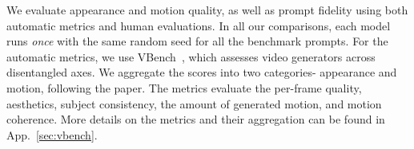 \begin{table}[t!]
    \caption{\textbf{Comparison of VideoJAM-30B with prior work on VideoJAM-bench.} Human evaluation shows \emph{percentage of votes favoring VideoJAM}; automatic metrics use VBench.}
  \label{tab:30b}
  \centering
    \setlength{\tabcolsep}{3.5pt}
    \vspace{-14px}
\end{table}
 We evaluate appearance and motion quality, as well as prompt fidelity using both automatic metrics and human evaluations. In all our comparisons, each model runs \emph{once} with the same random seed for all the benchmark prompts. For the automatic metrics, we use VBench~\cite{huang2023vbench}, which assesses video generators across disentangled axes. We aggregate the scores into two categories- appearance and motion, following the paper. The metrics evaluate the per-frame quality, aesthetics, subject consistency, the amount of generated motion, and motion coherence. More details on the metrics and their aggregation can be found in App.~\ref{sec:vbench}.

